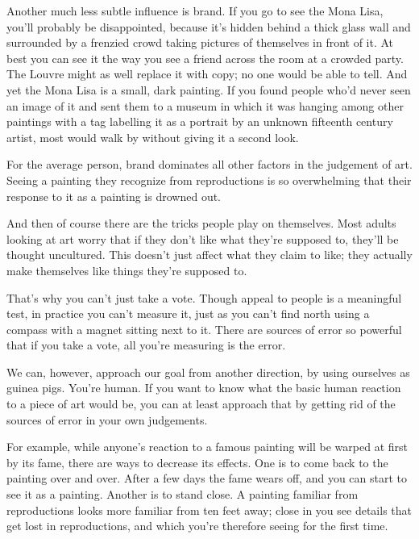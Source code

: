 Another
                  much less subtle influence is brand. If you go to see the Mona
                  Lisa, you'll probably be disappointed, because it's hidden
                  behind a thick glass wall and surrounded by a frenzied crowd
                  taking pictures of themselves in front of it. At best you can
                  see it the way you see a friend across the room at a crowded
                  party. The Louvre might as well replace it with copy; no one
                  would be able to tell. And yet the Mona Lisa is a small, dark
                  painting. If you found people who'd never seen an image of it
                  and sent them to a museum in which it was hanging among other
                  paintings with a tag labelling it as a portrait by an unknown
                  fifteenth century artist, most would walk by without giving it
                  a second look.

For the average person, brand
                  dominates all other factors in the judgement of art. Seeing a
                  painting they recognize from reproductions is so overwhelming
                  that their response to it as a painting is drowned out.

And
                  then of course there are the tricks people play on themselves.
                  Most adults looking at art worry that if they don't like what
                  they're supposed to, they'll be thought uncultured. This
                  doesn't just affect what they claim to like; they actually
                  make themselves like things they're supposed to.

That's
                  why you can't just take a vote. Though appeal to people is a
                  meaningful test, in practice you can't measure it, just as you
                  can't find north using a compass with a magnet sitting next to
                  it. There are sources of error so powerful that if you take a
                  vote, all you're measuring is the error.

We can,
                  however, approach our goal from another direction, by using
                  ourselves as guinea pigs. You're human. If you want to know
                  what the basic human reaction to a piece of art would be, you
                  can at least approach that by getting rid of the sources of
                  error in your own judgements.

For example, while
                  anyone's reaction to a famous painting will be warped at first
                  by its fame, there are ways to decrease its effects. One is to
                  come back to the painting over and over. After a few days the
                  fame wears off, and you can start to see it as a painting.
                  Another is to stand close. A painting familiar from
                  reproductions looks more familiar from ten feet away; close in
                  you see details that get lost in reproductions, and which
                  you're therefore seeing for the first time.

